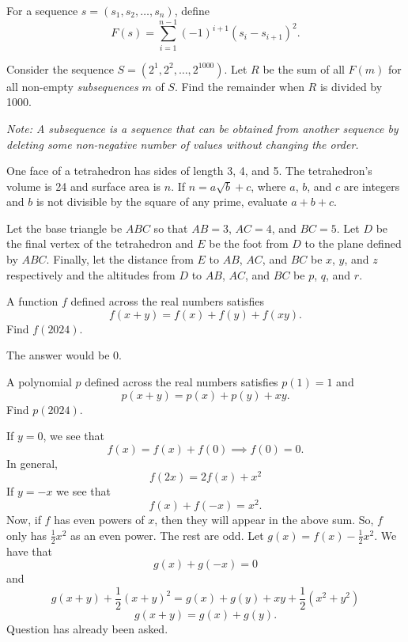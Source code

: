 \documentclass[11pt]{scrartcl}
\begin{document}
\begin{problem}
    For a sequence $s = (s_{1}, s_{2}, \dots, s_{n})$, define
    \[F(s) = \sum_{i = 1}^{n - 1} (-1)^{i + 1}(s_{i} - s_{i + 1})^{2}.\]

    Consider the sequence $S = (2^{1}, 2^{2}, \dots, 2^{1000})$. Let $R$ be the sum of all 
    $F(m)$ for all non-empty \emph{subsequences} $m$ of $S$. Find the remainder when $R$ is divided by 1000.

    \emph{Note: A subsequence is a sequence that can be obtained from another sequence by deleting some non-negative number of values without changing the order.}
\end{problem}

\begin{soln}

\end{soln}

\begin{problem}
    One face of a tetrahedron has sides of length 3, 4, and 5. The tetrahedron's volume is 24 and surface area is $n$. If $n = a\sqrt{b} + c$, where $a$, $b$, and $c$ are integers and $b$ is not divisible by the square of any prime, evaluate $a + b + c$.
\end{problem}

\begin{soln}
    Let the base triangle be $ABC$ so that $AB = 3$, $AC = 4$, and $BC = 5$. Let $D$ be the final vertex of the tetrahedron and $E$ be the foot from $D$ to the plane defined by $ABC$. Finally, let the distance from $E$ to $AB$, $AC$, and $BC$ be $x$, $y$, and $z$ respectively and the altitudes from $D$ to $AB$, $AC$, and $BC$ be $p$, $q$, and $r$.
\end{soln}

\begin{problem}
    A function $f$ defined across the real numbers satisfies
    \[f(x + y) = f(x) + f(y) + f(xy).\]
    Find $f(2024)$.
\end{problem}

\begin{soln}
    The answer would be 0.
\end{soln}

\begin{problem}
    A polynomial $p$ defined across the real numbers satisfies $p(1) = 1$ and
    \[p(x + y) = p(x) + p(y) + xy.\]
    Find $p(2024)$.
\end{problem}

\begin{soln}
    If $y = 0$, we see that
    \[f(x) = f(x) + f(0) \implies f(0) = 0.\]
    In general,
    \[f(2x) = 2f(x) + x^{2}\]
    If $y = -x$ we see that
    \[f(x) + f(-x) = x^{2}.\]
    Now, if $f$ has even powers of $x$, then they will appear in the above sum. So, $f$ only has $\frac{1}{2}x^{2}$ as an even power. The rest are odd. Let $g(x) = f(x) - \frac{1}{2}x^{2}$. We have that
    \[g(x) + g(-x) = 0\]
    and
    \[g(x + y) + \frac{1}{2}(x + y)^{2} = g(x) + g(y) + xy + \frac{1}{2}(x^{2} + y^{2})\]
    \[g(x + y) = g(x) + g(y).\]
    Question has already been asked.
\end{soln}
\end{document}
